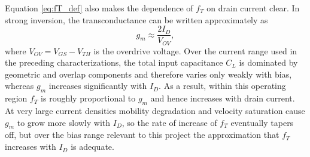\documentclass[11pt]{article}
\begin{document}
Equation \eqref{eq:fT_def} also makes the dependence of $f_T$ on drain current
clear. In strong inversion, the transconductance can be written approximately as
\[
  g_m \approx \frac{2I_D}{V_{OV}},
\]
where $V_{OV} = V_{GS} - V_{TH}$ is the overdrive voltage. Over the current
range used in the preceding characterizations, the total input capacitance
$C_L$ is dominated by geometric and overlap components and therefore varies only
weakly with bias, whereas $g_m$ increases significantly with $I_D$. As a
result, within this operating region $f_T$ is roughly proportional to $g_m$ and
hence increases with drain current. At very large current densities mobility
degradation and velocity saturation cause $g_m$ to grow more slowly with $I_D$,
so the rate of increase of $f_T$ eventually tapers off, but over the bias range
relevant to this project the approximation that $f_T$ increases with $I_D$ is
adequate.

\newpage
\end{document}
